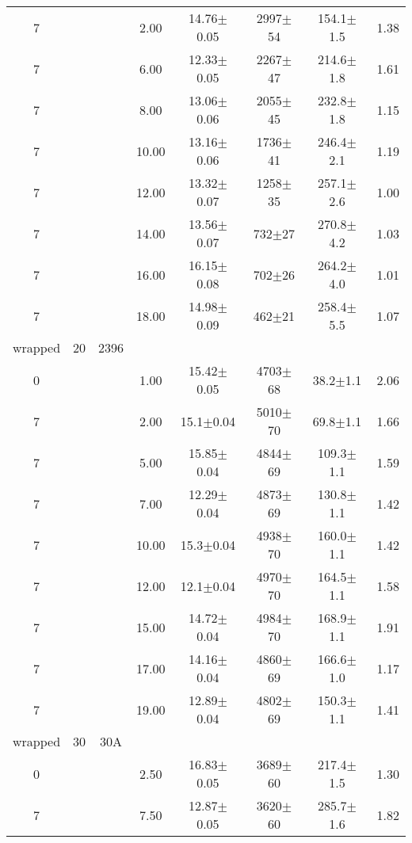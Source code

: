 \begin{tabular}{ccccccc}
7
 &  &  &       2.00 &   14.76$\pm$0.05 &  2997$\pm$54 &  154.1$\pm$1.5 &        1.38 \\
7
 &  &  &       6.00 &   12.33$\pm$0.05 &  2267$\pm$47 &  214.6$\pm$1.8 &        1.61 \\
7
 &  &  &       8.00 &   13.06$\pm$0.06 &  2055$\pm$45 &  232.8$\pm$1.8 &        1.15 \\
7
 &  &  &      10.00 &   13.16$\pm$0.06 &  1736$\pm$41 &  246.4$\pm$2.1 &        1.19 \\
7
 &  &  &      12.00 &   13.32$\pm$0.07 &  1258$\pm$35 &  257.1$\pm$2.6 &        1.00 \\
7
 &  &  &      14.00 &   13.56$\pm$0.07 &   732$\pm$27 &  270.8$\pm$4.2 &        1.03 \\
7
 &  &  &      16.00 &   16.15$\pm$0.08 &   702$\pm$26 &  264.2$\pm$4.0 &        1.01 \\
7
 &  &  &      18.00 &   14.98$\pm$0.09 &   462$\pm$21 &  258.4$\pm$5.5 &        1.07 \\
wrapped & 20 & 2396 &   &   &   &   & \\
0
 &  &  &       1.00 &   15.42$\pm$0.05 &  4703$\pm$68 &   38.2$\pm$1.1 &        2.06 \\
7
 &  &  &       2.00 &    15.1$\pm$0.04 &  5010$\pm$70 &   69.8$\pm$1.1 &        1.66 \\
7
 &  &  &       5.00 &   15.85$\pm$0.04 &  4844$\pm$69 &  109.3$\pm$1.1 &        1.59 \\
7
 &  &  &       7.00 &   12.29$\pm$0.04 &  4873$\pm$69 &  130.8$\pm$1.1 &        1.42 \\
7
 &  &  &      10.00 &    15.3$\pm$0.04 &  4938$\pm$70 &  160.0$\pm$1.1 &        1.42 \\
7
 &  &  &      12.00 &    12.1$\pm$0.04 &  4970$\pm$70 &  164.5$\pm$1.1 &        1.58 \\
7
 &  &  &      15.00 &   14.72$\pm$0.04 &  4984$\pm$70 &  168.9$\pm$1.1 &        1.91 \\
7
 &  &  &      17.00 &   14.16$\pm$0.04 &  4860$\pm$69 &  166.6$\pm$1.0 &        1.17 \\
7
 &  &  &      19.00 &   12.89$\pm$0.04 &  4802$\pm$69 &  150.3$\pm$1.1 &        1.41 \\
wrapped & 30 & 30A &   &   &   &   & \\
0
 &  &  &       2.50 &   16.83$\pm$0.05 &  3689$\pm$60 &  217.4$\pm$1.5 &        1.30 \\
7
 &  &  &       7.50 &   12.87$\pm$0.05 &  3620$\pm$60 &  285.7$\pm$1.6 &        1.82 \\

\end{tabular}
